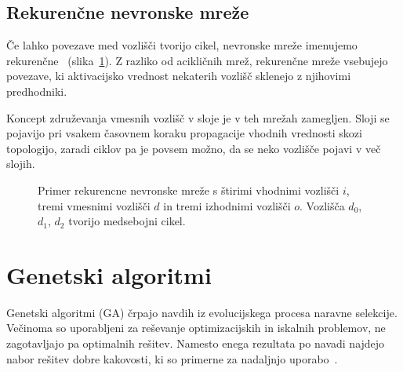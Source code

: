 \documentclass[a4paper,12pt,openright]{book}
\begin{document}
    \subsection{Rekurenčne nevronske mreže}\label{subsec:rekurencne-nevronske-mreze}
    Če lahko povezave med vozlišči tvorijo cikel, nevronske mreže imenujemo rekurenčne~\cite{recurrent_neural_network_wiki} (slika~\ref{fig:diagram-rekurencne-mreze}).
    Z razliko od acikličnih mrež, rekurenčne mreže vsebujejo povezave, ki aktivacijsko vrednost nekaterih vozlišč
    sklenejo z njihovimi predhodniki.

    Koncept združevanja vmesnih vozlišč v sloje je v teh mrežah zamegljen.
    Sloji se pojavijo pri vsakem časovnem koraku propagacije vhodnih vrednosti skozi topologijo, zaradi ciklov pa je povsem možno,
    da se neko vozlišče pojavi v več slojih.
    \begin{figure}[H]
        \begin{center}
            
        \end{center}
        \caption{Primer rekurencne nevronske mreže s štirimi vhodnimi vozlišči $i$, tremi vmesnimi vozlišči $d$ in tremi izhodnimi vozlišči $o$.
        Vozlišča $d_0$, $d_1$, $d_2$ tvorijo medsebojni cikel.}
        \label{fig:diagram-rekurencne-mreze}
    \end{figure}

    \section{Genetski algoritmi}\label{sec:genetski-algoritmi}
    Genetski algoritmi (GA) črpajo navdih iz evolucijskega procesa naravne selekcije.
    Večinoma so uporabljeni za reševanje optimizacijskih in iskalnih problemov, ne zagotavljajo pa optimalnih rešitev.
    Namesto enega rezultata po navadi najdejo nabor rešitev dobre kakovosti, ki so primerne za nadaljnjo
    uporabo~\cite{inteligentni_sistemi_2010,genetic_algorithm_wiki_2022}.
\end{document}
